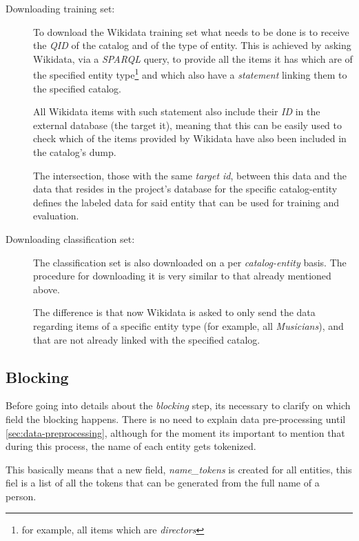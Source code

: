 \documentclass[epsfig,a4paper,11pt,titlepage,twoside,openany]{book}
\begin{document}
\begin{description}
\item[Downloading training set:] 


To download the Wikidata training set what needs to be done is to receive the \textit{QID} of the catalog and of the type of entity. This is achieved by asking Wikidata, via a \textit{SPARQL} query, to provide all the items it has which are of the specified entity type\footnote{for example, all items which are \textit{directors}} and which also have a \textit{statement} linking them to the specified catalog. 


All Wikidata items with such statement also include their \textit{ID} in the external database (the target it), meaning that this can be easily used to check which of the items provided by Wikidata have also been included in the catalog's dump. 


The intersection, those with the same \textit{target id}, between this data and the data that resides in the project’s database for the specific catalog-entity defines the labeled data  for said entity that can be used for training and evaluation.
 
\item[Downloading classification set:] The classification set is also downloaded on a per \textit{catalog-entity} basis. The procedure for downloading it is very similar to that already mentioned above. 


The difference is that now Wikidata is asked to only send  the data regarding items of a specific entity type (for example, all \textit{Musicians}), and that are not already linked with the specified catalog.
\end{description}



\subsection{Blocking}
\label{sec:soweego-st-blocking}

Before going into details about the \textit{blocking} step, its necessary to clarify on which field the blocking happens. There is no need to explain data pre-processing until \autoref{sec:data-preprocessing}, although for the moment its important to mention that during this process, the name of each entity gets tokenized. 


This basically means that a new field,  \textit{name\_tokens} is created for all entities, this fiel is a list of all the tokens that can be generated from the full name of a person.
\end{document}

